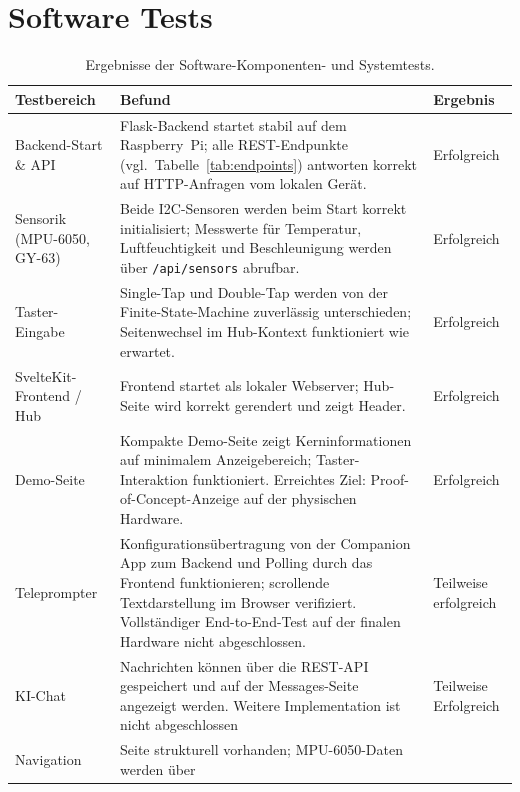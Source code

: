 \chapter{Software Tests}
\label{apx:softwaretests}
\begin{table}[htbp]
  \centering
  \caption{Ergebnisse der Software-Komponenten- und Systemtests.}
  \begin{tabularx}{\textwidth}{@{} l X l @{}}
    \toprule
    \textbf{Testbereich} & \textbf{Befund} & \textbf{Ergebnis} \\
    \midrule
    Backend-Start \& API &
      Flask-Backend startet stabil auf dem Raspberry~Pi; alle
      REST-Endpunkte (vgl.~Tabelle~\ref{tab:endpoints}) antworten
      korrekt auf HTTP-Anfragen vom lokalen Gerät. &
      Erfolgreich \\
    \addlinespace
    Sensorik (MPU-6050, GY-63) &
      Beide I2C-Sensoren werden beim Start korrekt initialisiert;
      Messwerte für Temperatur, Luftfeuchtigkeit und
      Beschleunigung werden über \texttt{/api/sensors} abrufbar. &
      Erfolgreich \\
    \addlinespace
    Taster-Eingabe &
      Single-Tap und Double-Tap werden von der Finite-State-Machine
      zuverlässig unterschieden; Seitenwechsel im Hub-Kontext
      funktioniert wie erwartet. &
      Erfolgreich \\
    \addlinespace
    SvelteKit-Frontend / Hub &
      Frontend startet als lokaler Webserver; Hub-Seite wird
      korrekt gerendert und zeigt Header. &
      Erfolgreich \\
    \addlinespace
    Demo-Seite &
      Kompakte Demo-Seite zeigt Kerninformationen auf minimalem
      Anzeigebereich; Taster-Interaktion funktioniert.
      Erreichtes Ziel: Proof-of-Concept-Anzeige auf der physischen
      Hardware. &
      Erfolgreich \\
    \addlinespace
    Teleprompter &
      Konfigurationsübertragung von der Companion App zum Backend
      und Polling durch das Frontend funktionieren;
      scrollende Textdarstellung im Browser verifiziert.
      Vollständiger End-to-End-Test auf der finalen Hardware
      nicht abgeschlossen. &
      Teilweise erfolgreich \\
    \addlinespace
    KI-Chat &
      Nachrichten können über die REST-API gespeichert und auf
      der Messages-Seite angezeigt werden. Weitere Implementation ist nicht abgeschlossen &
      Teilweise Erfolgreich \\
    \addlinespace
    Navigation &
      Seite strukturell vorhanden; MPU-6050-Daten werden über

\end{tabularx}
\end{table}
